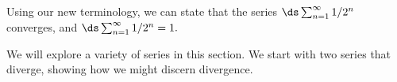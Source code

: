 Using our new terminology, we can state that the series $\ds \sum_{n=1}^\infty 1/2^n$ converges, and $\ds \sum_{n=1}^\infty 1/2^n = 1.$


We will explore a variety of series in this section. We start with two series that diverge, showing how we might discern divergence.

